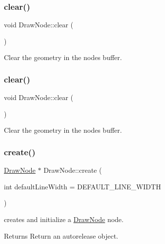 \subsubsection{\texorpdfstring{clear()}{clear()}\hspace{0.1cm}{\footnotesize\ttfamily [1/2]}}
{\footnotesize\ttfamily void Draw\+Node\+::clear (\begin{DoxyParamCaption}{ }\end{DoxyParamCaption})}

Clear the geometry in the node\textquotesingle{}s buffer. \mbox{\label{classDrawNode_a9e650c39c26a8ba3c912f21388b2218d}} 
\subsubsection{\texorpdfstring{clear()}{clear()}\hspace{0.1cm}{\footnotesize\ttfamily [2/2]}}
{\footnotesize\ttfamily void Draw\+Node\+::clear (\begin{DoxyParamCaption}{ }\end{DoxyParamCaption})}

Clear the geometry in the node\textquotesingle{}s buffer. \mbox{\label{classDrawNode_af4af0612e76dd98c04d95a946e3fb47f}} 
\subsubsection{\texorpdfstring{create()}{create()}\hspace{0.1cm}{\footnotesize\ttfamily [1/2]}}
{\footnotesize\ttfamily \hyperlink{classDrawNode}{Draw\+Node} $\ast$ Draw\+Node\+::create (\begin{DoxyParamCaption}\item[{int}]{default\+Line\+Width = {\ttfamily DEFAULT\+\_\+LINE\+\_\+WIDTH} }\end{DoxyParamCaption})\hspace{0.3cm}{\ttfamily [static]}}

creates and initialize a \hyperlink{classDrawNode}{Draw\+Node} node.

\begin{DoxyReturn}{Returns}
Return an autorelease object. 
\end{DoxyReturn}
\mbox{\label{classDrawNode_a2caa3d228ff9195174ad1b8ea7a17cc0}} 
